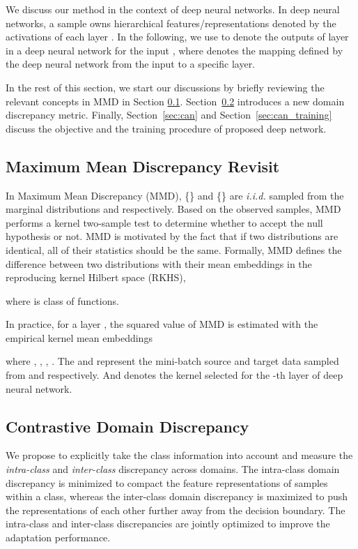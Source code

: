 \documentclass[10pt,twocolumn,letterpaper]{article}
\begin{document}
We discuss our method in the context of deep neural networks.
In deep neural networks, a sample owns hierarchical features/representations denoted by the activations of each layer . 
In the following, 
we use  
to denote the outputs of layer  in a deep neural network   for the input ,
where  denotes the mapping defined by the deep neural network 
from the input to a specific layer. 


In the rest of this section, we start our discussions by briefly reviewing the relevant concepts in MMD in Section \ref{revisit}. Section~\ref{sec:cdd} introduces a new domain discrepancy metric.  Finally, Section~\ref{sec:can} and Section~\ref{sec:can_training} discuss the objective and 
the training procedure of proposed deep network.




\subsection{Maximum Mean Discrepancy Revisit} \label{revisit}

In Maximum Mean Discrepancy (MMD), \{\} and \{\} are \textit{i.i.d.} sampled from  the marginal distributions  and  respectively. Based on the observed samples, 
MMD \cite{sejdinovic2013equivalence} performs a kernel two-sample test to determine whether to accept the null hypothesis  or not.
MMD is motivated by the fact that if two distributions are identical, all of their statistics should be the same. Formally, MMD defines the difference between two distributions with their mean embeddings 
in the reproducing kernel Hilbert space (RKHS), \ie

where  is class of functions.

In practice, for a layer , the squared value of MMD is estimated with the empirical kernel mean embeddings 

where , , 
, . 
The  and  represent the mini-batch source and target data sampled from 
 and  respectively.
And  denotes the kernel selected for the -th layer of deep neural network.




\subsection{Contrastive Domain Discrepancy}\label{sec:cdd}


We propose to explicitly take the class information into account and measure the \emph{intra-class} and \emph{inter-class} discrepancy across domains.
The intra-class domain discrepancy is minimized to compact the feature representations of  samples within a class,
whereas the inter-class domain discrepancy is maximized to push the representations of each other further away from the decision boundary. The intra-class and inter-class discrepancies are jointly optimized to improve the adaptation performance.
\end{document}
